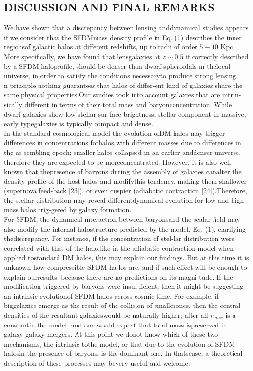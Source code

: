 \documentclass{article}\newcommand\Star[1]{#1\textsuperscript{*}}
\begin{document}
\begin{multicols}{2}
	\section{DISCUSSION AND FINAL REMARKS}
	We have shown that a discrepancy between lensing anddynamical studies appears if we consider that the SFDMmass density profile in Eq. (1) describes the inner regionsof galactic halos at different redshifts, up to radii of order \(5-10 \) Kpc.   More  specifically,  we  have  found  that  lensgalaxies at \(z\sim0.5\) if correctly described by a SFDM haloprofile,  should  be  denser  than  dwarf  spheroidals  in  thelocal universe, in order to satisfy the conditions necessaryto produce strong lensing.\\
	n  principle  nothing  guarantees  that  halos  of  differ-ent kind of galaxies share the same physical properties.Our  studies  took  into  account  galaxies  that  are  intrin-sically different in terms of their total mass and baryonconcentration.  While dwarf galaxies show low stellar sur-face brightness, stellar component in massive, early typegalaxies is typically compact and dense.\\
	In  the  standard  cosmological  model  the  evolution  ofDM  halos  may  trigger  differences  in  concentrations  forhalos with different masses due to differences in the as-sembling epoch; smaller halos collapsed in an earlier anddenser universe, therefore they are expected to be moreconcentrated.   However,  it  is  also  well  known  that  thepresence of baryons during the assembly of galaxies canalter  the  density  profile  of  the  host  halos  and  modifythis  tendency,  making  them  shallower  (supernova  feed-back  [23]),  or  even  cuspier  (adiabatic  contraction  [24]).Therefore,  the  stellar  distribution  may  reveal  differentdynamical  evolution  for  low  and  high  mass  halos  trig-gered by galaxy formation.\\
	For SFDM, the dynamical interaction between baryonsand  the  scalar  field  may  also  modify  the  internal  halostructure predicted by the model, Eq. (1), clarifying thediscrepancy.   For  instance,  if  the  concentration  of  stel-lar  distribution  were  correlated  with  that  of  the  halo,like in the adiabatic contraction model when applied tostandard DM halos, this may explain our findings.  But at this time it is unknown how compressible SFDM ha-los are, and if such effect will be enough to explain ourresults,  because  there  are  no  predictions  on  its  magni-tude. If the modification triggered by baryons were insuf-ficient, then it might be suggesting an intrinsic evolutionof SFDM halos across cosmic time.  For example, if biggalaxies  emerge  as  the  result  of  the  collision  of  smallerones, then the central densities of the resultant galaxieswould be naturally higher;  after all \(r_{max}\) is a constantin  the  model,  and  one  would  expect  that  total  mass  ispreserved in galaxy-galaxy mergers.  At this point we donot know which of these two mechanisms, the intrinsic tothe model, or that due to the evolution of SFDM halosin the presence of baryons, is the dominant one.  In thatsense, a theoretical description of these processes may bevery useful and welcome.\\

\end{multicols}
\end{document}
